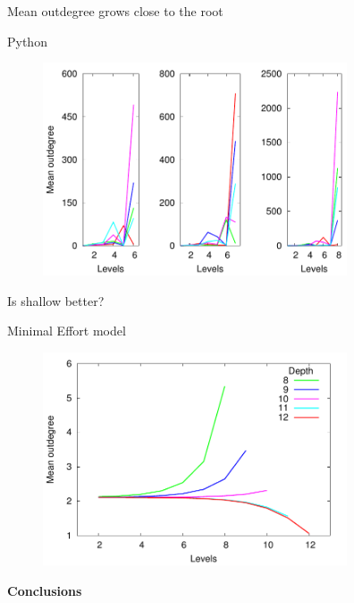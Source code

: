 \documentclass[11pt,svgnames]{beamer}
\begin{document}
\begin{frame}[noframenumbering]{Mean outdegree grows close to the root}%
\begin{tcolorbox}[colframe=blue]
\center
 Python
\end{tcolorbox}
\begin{figure}[hp]%
\includegraphics[width=9cm,draft=false]{immagini/PY_OvsD.pdf}
\end{figure}
\end{frame}
\begin{frame}{Is shallow better?}%
\begin{tcolorbox}[colframe=SkyBlue]
\center
 Minimal Effort model
\end{tcolorbox}
\begin{figure}[p]%
\includegraphics[width=9cm,draft=false]{immagini/EM_OvsD.pdf}
\end{figure}
\end{frame}

\begingroup
{}
\begin{frame}
\center
\textbf {\Huge {\color{white} {Conclusions}}}

\end{frame}
\endgroup
\end{document}
